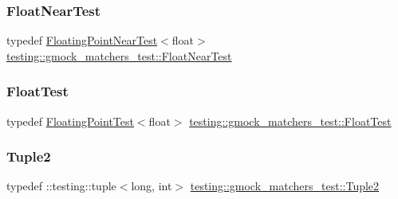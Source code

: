 \mbox{\label{namespacetesting_1_1gmock__matchers__test_a426b51f464dcb48033946e1bf3cc8795}} 
\subsubsection{\texorpdfstring{FloatNearTest}{FloatNearTest}}
{\footnotesize\ttfamily typedef \mbox{\hyperlink{classtesting_1_1gmock__matchers__test_1_1FloatingPointNearTest}{Floating\+Point\+Near\+Test}}$<$float$>$ \mbox{\hyperlink{namespacetesting_1_1gmock__matchers__test_a426b51f464dcb48033946e1bf3cc8795}{testing\+::gmock\+\_\+matchers\+\_\+test\+::\+Float\+Near\+Test}}}

\mbox{\label{namespacetesting_1_1gmock__matchers__test_a145329e433869625f9f0e98a0cdfd7b4}} 
\subsubsection{\texorpdfstring{FloatTest}{FloatTest}}
{\footnotesize\ttfamily typedef \mbox{\hyperlink{classtesting_1_1gmock__matchers__test_1_1FloatingPointTest}{Floating\+Point\+Test}}$<$float$>$ \mbox{\hyperlink{namespacetesting_1_1gmock__matchers__test_a145329e433869625f9f0e98a0cdfd7b4}{testing\+::gmock\+\_\+matchers\+\_\+test\+::\+Float\+Test}}}

\mbox{\label{namespacetesting_1_1gmock__matchers__test_a8b82c859cd28da9e7f7d4c6091a3165c}} 
\subsubsection{\texorpdfstring{Tuple2}{Tuple2}}
{\footnotesize\ttfamily typedef \+::testing\+::tuple$<$long, int$>$ \mbox{\hyperlink{namespacetesting_1_1gmock__matchers__test_a8b82c859cd28da9e7f7d4c6091a3165c}{testing\+::gmock\+\_\+matchers\+\_\+test\+::\+Tuple2}}}



